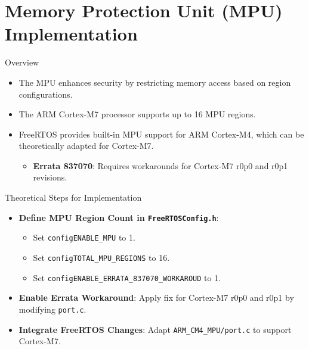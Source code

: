 
\section{Memory Protection Unit (MPU) Implementation}

\begin{frame}{Overview}
    \begin{itemize}
        \item The MPU enhances security by restricting memory access based on region configurations.
        \item The ARM Cortex-M7 processor supports up to 16 MPU regions.
        \item FreeRTOS provides built-in MPU support for ARM Cortex-M4, which can be theoretically adapted for Cortex-M7.
        \begin{itemize}
            \item \textbf{Errata 837070}: Requires workarounds for Cortex-M7 r0p0 and r0p1 revisions. 
        \end{itemize}
    \end{itemize}
\end{frame}

\begin{frame}{Theoretical Steps for Implementation}
    \begin{itemize}
        \item \textbf{Define MPU Region Count in \texttt{FreeRTOSConfig.h}}:
            \begin{itemize}
                \item Set \texttt{configENABLE\_MPU} to 1.
                \item Set \texttt{configTOTAL\_MPU\_REGIONS} to 16.
                \item Set \texttt{configENABLE\_ERRATA\_837070\_WORKAROUD} to 1.
            \end{itemize}
        \item \textbf{Enable Errata Workaround}: Apply fix for Cortex-M7 r0p0 and r0p1 by modifying \texttt{port.c}.
        \item \textbf{Integrate FreeRTOS Changes}: Adapt \texttt{ARM\_CM4\_MPU/port.c} to support Cortex-M7.
    \end{itemize}
\end{frame}

